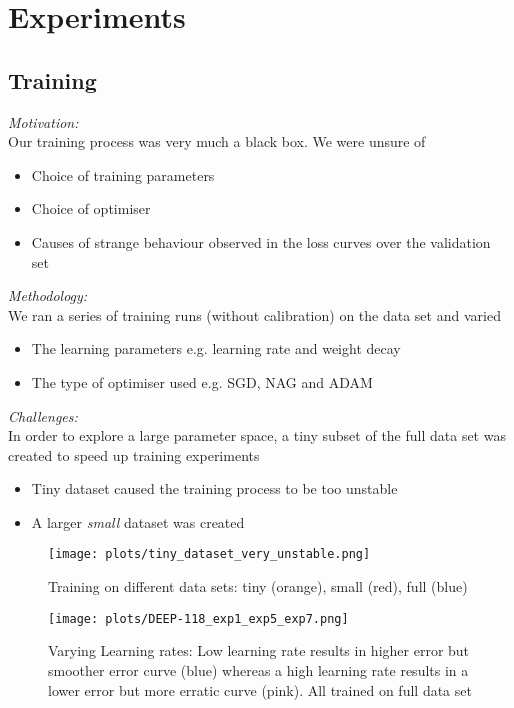 \documentclass[aspectratio=1610,t,notes=hide]{beamer}
\begin{document}
\section{Experiments}

\subsection{Training}

{
\emph{Motivation:}\\
Our training process was very much a black box. We were unsure of
\begin{itemize}
  \item Choice of training parameters
  \item Choice of optimiser
  \item Causes of strange behaviour observed in the loss curves over the
  validation set
\end{itemize}
\emph{Methodology:}\\
We ran a series of training runs (without calibration) on the data set and
varied
\begin{itemize}
  \item The learning parameters e.g. learning rate and weight decay
  \item The type of optimiser used e.g. SGD, NAG and ADAM
\end{itemize}
}

{
\emph{Challenges:}\\
In order to explore a large parameter space, a tiny subset of the full data set
was created to speed up training experiments

\begin{itemize}
  \item Tiny dataset caused the training process to be too unstable
  \item A larger \emph{small} dataset was created
\end{itemize}

}

{
\begin{figure}
\centering
\texttt{[image: plots/tiny\_dataset\_very\_unstable.png]}
\caption{Training on different data sets: tiny (orange), small (red), full
(blue)}
\end{figure}
}

{
\begin{figure}
\centering
\texttt{[image: plots/DEEP-118\_exp1\_exp5\_exp7.png]}
\caption{Varying Learning rates: Low learning rate results in higher error but
smoother error curve (blue) whereas a high learning rate results in a lower
error but more erratic curve (pink). All trained on full data set}
\end{figure}
}
\end{document}
